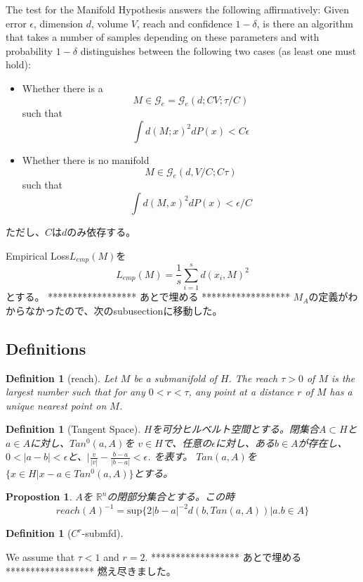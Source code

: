 \documentclass{ujarticle}
\newtheorem{dfn}[thm]{Definition}
\newtheorem{prop}[thm]{Propostion}
\begin{document}
The test for the Manifold Hypothesis answers the following affirmatively: Given error $\epsilon$, dimension $d$,
volume $V$, reach and confidence $1 - \delta$, is there an algorithm that takes a number of samples depending on
these parameters and with probability $1 - \delta$ distinguishes between the following two cases (as least one must
hold):
\begin{itemize}
  \item Whether there is a
  \begin{equation*}
    M \in \mathcal{G}_e = \mathcal{G}_e(d;CV;\tau/C)
  \end{equation*}
  such that
  \begin{equation*}
    \int d(M; x)^2 dP(x) < C \epsilon
  \end{equation*}
  \item Whether there is no manifold
  \begin{equation*}
    M \in \mathcal{G}_e(d, V/C; C\tau)
  \end{equation*}
  such that
  \begin{equation*}
    \int d(M,x)^2dP(x) < \epsilon/C
  \end{equation*}
\end{itemize}
ただし、$C$は$d$のみ依存する。

Empirical Loss$L_{emp}(M)$を
\begin{equation*}
 L_{emp}(M)= \frac{1}{s}\sum_{i=1}^s d(x_i,M)^2
\end{equation*}
とする。
******************
 あとで埋める
******************
$M_A$の定義がわからなかったので、次のsubusectionに移動した。

\subsection{Definitions}
\label{sub-Definitions}
\begin{dfn}[reach]
  Let $M$ be a submanifold of $H$. The reach $ \tau > 0$ of $M$ is the largest number such that
  for any $0 < r < \tau$, any point at a distance $r$ of $M$ has a unique nearest point on $M$.
\end{dfn}

\begin{dfn}[Tangent Space]
$H$を可分ヒルベルト空間とする。閉集合$A \subset H$と$a \in A$に対し、$Tan^0(a,A)$を
$v \in H$で、任意の$\epsilon$に対し、ある$b \in A$が存在し、$0 <|a -b| < \epsilon$と、$|\frac{v}{|v|} - \frac{b-a}{|b-a|} < \epsilon$.
を表す。
$Tan(a,A)$を$\{x \in H| x -a \in Tan^0(a,A)\}$とする。
\end{dfn}
\begin{prop} $A$を $\mathbb{R}^n$の閉部分集合とする。この時
  \begin{equation*}
   reach(A)^{-1}=\mathrm{sup}\{2|b-a|^{-2}d(b,Tan(a,A)) | a.b \in A\}
  \end{equation*}
\end{prop}
\begin{dfn}[$C^r$-submfd]

\end{dfn}
We assume that $\tau < 1$ and $r = 2$.
******************
 あとで埋める
******************
燃え尽きました。
\end{document}
